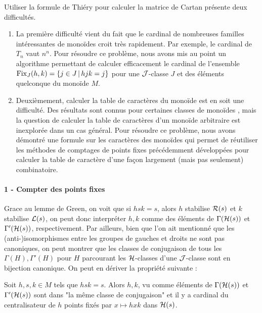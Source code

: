 \documentclass{article}
\begin{document}
	Utiliser la formule de Thiéry pour calculer la matrice de Cartan présente deux difficultés. 
	\begin{enumerate}
		\item La première difficulté vient du fait que le cardinal de nombreuses familles intéressantes de monoïdes croit très rapidement. Par exemple, le cardinal de $T_n$ vaut $n^n$. 
		Pour résoudre ce problème, nous avons mis au point un algorithme permettant de calculer efficacement le cardinal de l'ensemble $\operatorname{Fix}_J(h, k) = \{j \in J \,\vert\, hjk=j\}$ pour une $\mathcal{J}$-classe $J$ et des éléments quelconque du monoïde $M$.
		\item Deuxièmement, calculer la table de caractères du monoïde est en soit une difficulté. Des résultats sont connus pour certaines classes de monoïdes \cite[Section 9.4]{steinberg2016representation}, mais la question de calculer la table de caractères d'un monoïde arbitraire est inexplorée dans un cas général.
		Pour résoudre ce problème, nous avons démontré une formule sur les caractères des monoïdes qui permet de réutiliser les méthodes de comptages de points fixes précédemment développées pour calculer la table de caractère d'une façon largement (mais pas seulement) combinatoire.
	\end{enumerate}
	
	
	\paragraph{1 - Compter des points fixes}
	
	Grace au lemme de Green, on voit que si $hsk = s$, alors $h$ stabilise $\mathcal{R}(s)$ et $k$ stabilise $\mathcal{L}(s)$, on peut donc interpréter $h, k$ comme des éléments de $\Gamma(\mathcal{H}(s))$ et $\Gamma'(\mathcal{H}(s))$, respectivement. Par ailleurs, bien que l'on ait mentionné que les (anti-)isomorphismes entre les groupes de \schu gauches et droits ne sont pas canoniques, on peut montrer que les classes de conjugaison de tous les $\Gamma(H), \Gamma'(H)$ pour $H$ parcourant les $\mathcal{H}$-classes d'une $\mathcal{J}$-classe sont en bijection canonique. On peut en dériver la propriété suivante :
	\begin{prop}
		Soit $h, s, k \in M$ tels que $hsk=s$. Alors $h, k$, vu comme éléments de $\Gamma(\mathcal{H}(s))$ et $\Gamma'(\mathcal{H}(s))$ sont dans "la même classe de conjugaison" et il y a cardinal du centralisateur de $h$ points fixés par $x \mapsto hxk$ dans $\mathcal{H}(s)$.
	\end{prop}
	
\end{document}
